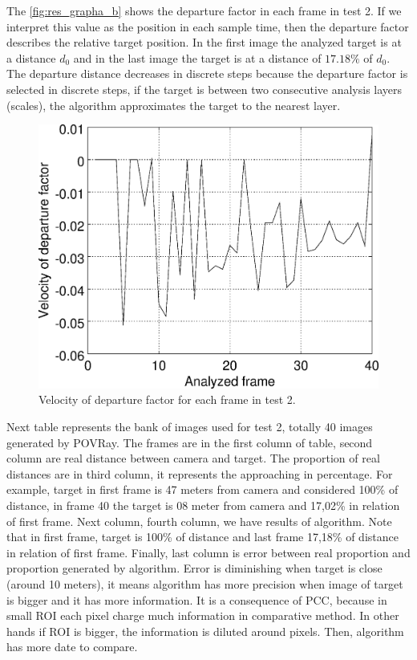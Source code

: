 The \ref{fig:res_grapha_b} shows the departure factor in each frame
in test 2. If we interpret this value as the position in each sample time, 
then the departure factor describes the relative target position.
In the first image the analyzed target is at a distance $d_0$ 
and in the last image the target is at a distance of $17.18\%$ of $d_0$.
The departure distance decreases in discrete steps because the departure
factor is selected in discrete steps, if the target is
between two consecutive analysis layers (scales), the algorithm
approximates the target to the nearest layer.

\begin{figure}[!hbt]
\includegraphics[width=\columnwidth]{images/grapha_bv.eps}
\caption{Velocity of departure factor for each frame in test 2.}
\label{fig:res_grapha_bv}
\end{figure}

Next table represents the bank of images used for test 2, totally 40 images generated by POVRay.
The frames are in the first column of table, second column are real distance between camera and target.
The proportion of real distances are in third column, it represents the approaching in percentage. For example, 
target in first frame is 47 meters from camera and considered 100\% of distance, in frame 40 the target is 08 meter 
from camera and 17,02\% in relation of first frame. Next column, fourth column, we have results of algorithm. 
Note that in first frame, target is 100\% of distance and last frame 17,18\% of distance in relation of first frame.
Finally, last column is error between real proportion and proportion generated by algorithm. 
Error is diminishing when target is close (around 10 meters), it means algorithm has more precision 
when image of target is bigger and it has more information. It is a consequence of PCC, 
because in small ROI each pixel charge much information in comparative method. In other hands if ROI is bigger,
the information is diluted around pixels. Then, algorithm has more date to compare.

